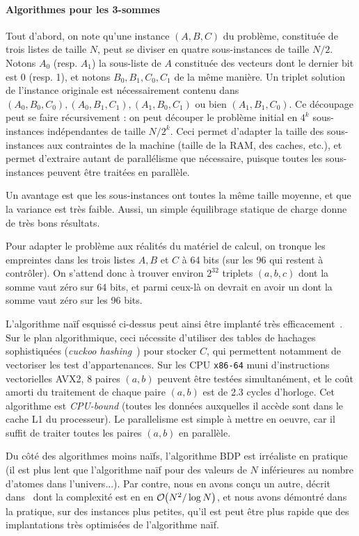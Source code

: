 \documentclass[
    a4paper, 
    12pt, onecolumn,
]{article}
\newcommand{\bigO}[1]{\mathcal{O}\hspace{-2px}\left(#1\right)}
\begin{document}
\paragraph{Algorithmes pour les 3-sommes}

Tout d'abord, on note qu'une instance $(A, B, C)$ du problème, constituée de
trois listes de taille $N$, peut se diviser en quatre sous-instances de taille
$N/2$. Notons $A_0$ (resp. $A_1$) la sous-liste de $A$ constituée des vecteurs
dont le dernier bit est 0 (resp. 1), et notons $B_0, B_1, C_0, C_1$ de la même
manière. Un triplet solution de l'instance originale est nécessairement contenu
dans $(A_0, B_0, C_0), (A_0, B_1, C_1), (A_1, B_0, C_1)$ ou bien
$(A_1, B_1, C_0)$. Ce découpage peut se faire récursivement : on peut découper
le problème initial en $4^k$ sous-instances indépendantes de taille
$N/2^k$. Ceci permet d'adapter la taille des sous-instances aux contraintes de
la machine (taille de la RAM, des caches, etc.), et permet d'extraire autant de
parallélisme que nécessaire, puisque toutes les sous-instances peuvent être
traitées en parallèle.

Un avantage est que les sous-instances ont toutes la même taille moyenne, et que
la variance est très faible. Aussi, un simple équilibrage statique de charge
donne de très bons résultats.

Pour adapter le problème aux réalités du matériel de calcul, on tronque les
empreintes dans les trois listes $A, B$ et $C$ à 64 bits (sur les 96 qui restent
à contrôler). On s'attend donc à trouver environ $2^{32}$ triplets $(a, b, c)$
dont la somme vaut zéro sur 64 bits, et parmi ceux-là on devrait en avoir un
dont la somme vaut zéro sur les 96 bits.

L'algorithme naïf esquissé ci-dessus peut ainsi être implanté très
efficacement~\cite{BouillaguetDF18}. Sur le plan algorithmique, ceci nécessite
d'utiliser des tables de hachages sophistiquées (\emph{cuckoo
  hashing}~\cite{Pagh01}) pour stocker $C$, qui permettent notamment de
vectoriser les test d'appartenances. Sur les CPU \texttt{x86-64} muni
d'instructions vectorielles \textsf{AVX2}, 8 paires $(a,b)$ peuvent être testées
simultanément, et le coût amorti du traitement de chaque paire $(a, b)$ est de
2.3 cycles d'horloge. Cet algorithme est \emph{CPU-bound} (toutes les données
auxquelles il accède sont dans le cache L1 du processeur). Le parallelisme est
simple à mettre en oeuvre, car il suffit de traiter toutes les paires $(a, b)$
en parallèle.

Du côté des algorithmes moins naïfs, l'algorithme BDP est irréaliste en pratique
(il est plus lent que l'algorithme naïf pour des valeurs de $N$ inférieures au
nombre d'atomes dans l'univers...). Par contre, nous en avons conçu un autre,
décrit dans~\cite{BouillaguetDF18} dont la complexité est en en
$\bigO{N^2 / \log N}$, et nous avons démontré dans la pratique, sur des
instances plus petites, qu'il est peut être plus rapide que des implantations
très optimisées de l'algorithme naïf.
\end{document}
